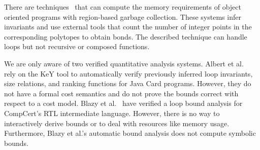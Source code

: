\documentclass[nocopyrightspace,preprint]{sigplanconf}
\begin{document}
There are techniques~\cite{Braberman08} that can compute the memory
requirements of object oriented programs with region-based garbage
collection.  These systems infer invariants and use external tools
that count the number of integer points in the corresponding polytopes
to obtain bonds.  The described technique can handle loops but not
recursive or composed functions.

We are only aware of two verified quantitative analysis systems.
Albert et al.~\cite{AlbertBGHR12} rely on the KeY tool to
automatically verify previously inferred loop invariants, size
relations, and ranking functions for Java Card programs.  However,
they do not have a formal cost semantics and do not prove the bounds
correct with respect to a cost model.  Blazy et al.~\cite{Blazy13}
have verified a loop bound analysis for CompCert's RTL intermediate
language.  However, there is no way to interactively derive bounds or
to deal with resources like memory usage.  Furthermore, Blazy et al.'s
automatic bound analysis does not compute symbolic bounds.


\newcommand{\loopbody}[0]{\ensuremath{\code{if~(x - 10 \geq 0)~\{x=x{-}10; tick(5);\}~else~break;}}}
\end{document}
